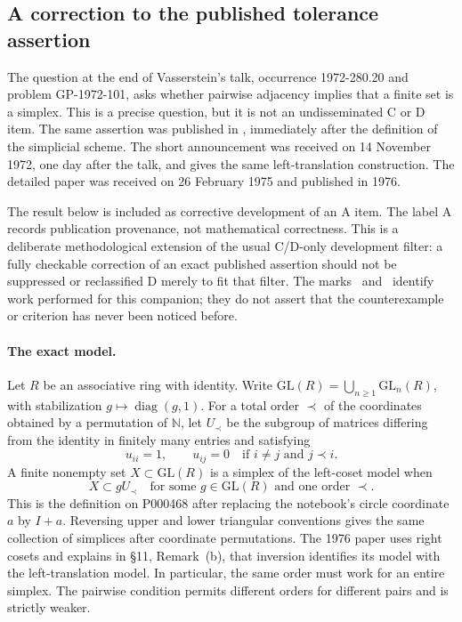 \subsection{A correction to the published tolerance assertion}
\label{sec:gy1972-tolerance-correction}

The question at the end of Vasserstein's talk, occurrence 1972-280.20 and
problem GP-1972-101, asks whether pairwise adjacency implies that a finite
set is a simplex. This is a precise question, but it is not an undisseminated
C or D item. The same assertion was published in
\citet[\S11, Remark~(c), p.~111]{vaserstein1976foundations}, immediately after
the definition of the simplicial scheme. The short announcement
\citep{vaserstein1973foundations} was received on 14 November 1972, one day
after the talk, and gives the same left-translation construction. The
detailed paper was received on 26 February 1975 and published in 1976.

The result below is included as corrective development of an A item.
The label A records publication provenance, not mathematical correctness.
This is a deliberate methodological extension of the usual C/D-only
development filter: a fully checkable correction of an exact published
assertion should not be suppressed or reclassified D merely to fit that
filter. The marks \ours\ and \oursComputed\ identify work performed for
this companion; they do not assert that the counterexample or criterion
has never been noticed before.

\paragraph{The exact model.}
Let \(R\) be an associative ring with identity. Write
\(\mathrm{GL}(R)=\bigcup_{n\geq1}\mathrm{GL}_n(R)\), with stabilization
\(g\mapsto\operatorname{diag}(g,1)\). For a total order \(\prec\) of the
coordinates obtained by a permutation of \(\mathbb N\), let
\(U_\prec\) be the subgroup of matrices differing from the identity in
finitely many entries and satisfying
\[
 u_{ii}=1,\qquad u_{ij}=0\quad\text{if }i\ne j\text{ and }j\prec i.
\]
A finite nonempty set \(X\subset\mathrm{GL}(R)\) is a simplex of the
left-coset model when
\[
                 X\subset gU_\prec
       \quad\text{for some }g\in\mathrm{GL}(R)\text{ and one order }\prec.
\]
This is the definition on P000468 after replacing the notebook's circle
coordinate \(a\) by \(I+a\). Reversing upper and lower triangular
conventions gives the same collection of simplices after coordinate
permutations. The 1976 paper uses right cosets and explains in
\S11, Remark~(b), that inversion identifies its model with the
left-translation model. In particular, the same order must work for an
entire simplex. The pairwise condition permits different orders for
different pairs and is strictly weaker.

